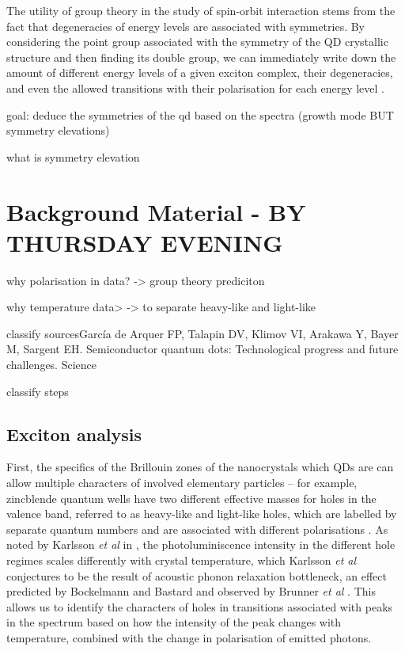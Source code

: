 \documentclass[12pt]{article}
\begin{document}
The utility of group theory in the study of spin-orbit interaction stems from the fact that degeneracies of energy levels are associated with symmetries. By considering the point group associated with the symmetry of the QD crystallic structure and then finding its double group, we can immediately write down the amount of different energy levels of a given exciton complex, their degeneracies, and even the allowed transitions with their polarisation for each energy level \cite[Ch. 19]{dresselhaus}.

goal: deduce the symmetries of the qd based on the spectra
(growth mode BUT symmetry elevations)

what is symmetry elevation

\section{Background Material - BY THURSDAY EVENING}

why polarisation in data? -> group theory prediciton

why temperature data> -> to separate heavy-like and light-like

classify sourcesGarcía de Arquer FP, Talapin DV, Klimov VI, Arakawa Y, Bayer M, Sargent EH. Semiconductor quantum dots: Technological progress and future challenges. Science

classify steps

\subsection{Exciton analysis}
First, the specifics of the Brillouin zones of the nanocrystals which QDs are can allow multiple characters of involved elementary particles -- for example, zincblende quantum wells have two different effective masses for holes in the valence band, referred to as heavy-like and light-like holes, which are labelled by separate quantum numbers and are associated with different polarisations \cite{karlsson2}. As noted by Karlsson \textit{et al} in \cite{karlsson}, the photoluminiscence intensity in the different hole regimes scales differently with crystal temperature, which Karlsson \textit{et al} conjectures to be the result of acoustic phonon relaxation bottleneck, an effect predicted by Bockelmann and Bastard \cite{bastard} and observed by Brunner \textit{et al} \cite{brunner}. This allows us to identify the characters of holes in transitions associated with peaks in the spectrum based on how the intensity of the peak changes with temperature, combined with the change in polarisation of emitted photons.
\end{document}
